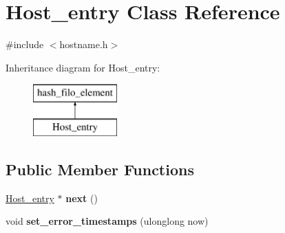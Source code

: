 \hypertarget{classHost__entry}{}\section{Host\+\_\+entry Class Reference}
\label{classHost__entry}


{\ttfamily \#include $<$hostname.\+h$>$}

Inheritance diagram for Host\+\_\+entry\+:\begin{figure}[H]
\begin{center}
\leavevmode
\includegraphics[height=2.000000cm]{classHost__entry}
\end{center}
\end{figure}
\subsection*{Public Member Functions}
\begin{DoxyCompactItemize}
\item 
\mbox{\label{classHost__entry_a4165b35a8482bc66fe56778ce1eecdb4}} 
\mbox{\hyperlink{classHost__entry}{Host\+\_\+entry}} $\ast$ {\bfseries next} ()
\item 
\mbox{\label{classHost__entry_aefda5dad57d3d0901a65f8a02ec044ab}} 
void {\bfseries set\+\_\+error\+\_\+timestamps} (ulonglong now)
\end{DoxyCompactItemize}
